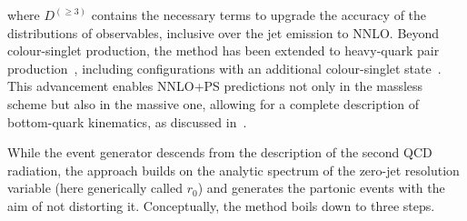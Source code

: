 \documentclass[11pt,a4paper]{article}
\begin{document}
where $D^{(\geq 3)}$ contains the necessary terms to upgrade the
accuracy of the distributions of observables, inclusive over the jet
emission to NNLO. Beyond colour-singlet production, the \minnlo{} method has been extended to heavy-quark pair production~\cite{mazzitelli:2020jio,mazzitelli:2021mmm}, including configurations with an additional colour-singlet state~\cite{mazzitelli:2024ura}. This advancement enables NNLO+PS predictions not only in the massless scheme but also in the massive one, allowing for a complete description of bottom-quark kinematics, as discussed in~.

While the \minnlo{} event generator descends from the \POWHEG{}
description of the second QCD radiation, the \GENEVA{} approach
\cite{Alioli:2015toa, Gavardi:2023aco} builds on the analytic spectrum
of the zero-jet resolution variable (here generically called $r_0$)
and generates the partonic events with the aim of not distorting
it. Conceptually, the \GENEVA{} method boils down to three steps.
\end{document}
